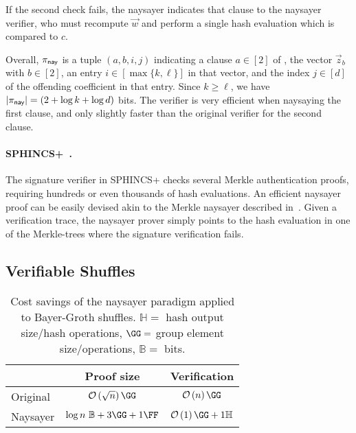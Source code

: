 If the second check fails, the naysayer indicates that clause to the naysayer verifier, who must recompute $\vec{w}$ and perform a single hash evaluation which is compared to $c$.

Overall, $\pi_{\mathsf{nay}}$ is a tuple $(a, b, i, j)$ indicating a clause $a \in [2]$ of , the vector $\vec{z}_b$ with $b \in [2]$, an entry $i \in [\max\{k,\ell\}]$ in that vector, and the index $j \in [d]$ of the offending coefficient in that entry. Since $k \geq \ell$, we have $\lvert \pi_{\mathsf{nay}} \rvert = (2+\log{k}+\log{d})$ bits. The verifier is very efficient when naysaying the first clause, and only slightly faster than the original verifier for the second clause.

\paragraph{SPHINCS+~\cite{CCS:BHKNRS19}.} The signature verifier in SPHINCS+ checks several Merkle authentication proofs, requiring hundreds or even thousands of hash evaluations. An efficient naysayer proof can be easily devised akin to the Merkle naysayer described in~. Given a verification trace, the naysayer prover simply points to the hash evaluation in one of the Merkle-trees where the signature verification fails. 

\subsection{Verifiable Shuffles}\label{sec:vshuffle_naysayer}

\begin{table}[h]
   \centering
    \setlength{\belowbottomsep}{6pt}
    \begin{tabular}{l c c} 
    \toprule
     & \textbf{Proof size}
     & \textbf{Verification}
     \\ \midrule
     Original
     & $\bigO{\sqrt{n}}\GG$
     & $\bigO{n}\GG$ 
     \\\midrule
     Naysayer
     & $\log{n}\ \mathbb{B}+3\GG+1\FF$ 
     & $\bigO{1}\GG + 1\mathbb{H}$
    \\ \bottomrule
    \end{tabular}
    \caption{Cost savings of the naysayer paradigm applied to Bayer-Groth shuffles. $\mathbb{H} =$ hash output size/hash operations, $\GG=$ group element size/operations, $\mathbb{B} =$ bits.}
    \label{tab:shuffle_asym}
   \end{table}

